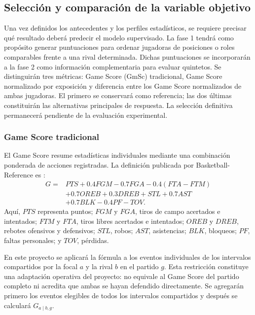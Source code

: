 \subsection{Selección y comparación de la variable objetivo}
\label{subsec:variable-objetivo-fase1}
Una vez definidos los antecedentes y los perfiles estadísticos, se requiere precisar qué resultado deberá predecir el modelo supervisado. La fase 1 tendrá como propósito generar puntuaciones para ordenar jugadoras de posiciones o roles comparables frente a una rival determinada. Dichas puntuaciones se incorporarán a la fase 2 como información complementaria para evaluar quintetos. Se distinguirán tres métricas: Game Score (GmSc) tradicional, Game Score normalizado por exposición y diferencia entre los Game Score normalizados de ambas jugadoras. El primero se conservará como referencia; las dos últimas constituirán las alternativas principales de respuesta. La selección definitiva permanecerá pendiente de la evaluación experimental.

\subsubsection*{Game Score tradicional}
El Game Score resume estadísticas individuales mediante una combinación ponderada de acciones registradas. La definición publicada por Basketball-Reference es \cite{basketballReferenceGameScore}:
\begin{equation}
\begin{split}
G={}&PTS+0.4FGM-0.7FGA-0.4(FTA-FTM)\\
&+0.7OREB+0.3DREB+STL+0.7AST\\
&+0.7BLK-0.4PF-TOV.
\end{split}
\label{eq:gmsc-615}
\end{equation}
Aquí, $PTS$ representa puntos; $FGM$ y $FGA$, tiros de campo acertados e intentados; $FTM$ y $FTA$, tiros libres acertados e intentados; $OREB$ y $DREB$, rebotes ofensivos y defensivos; $STL$, robos; $AST$, asistencias; $BLK$, bloqueos; $PF$, faltas personales; y $TOV$, pérdidas.

En este proyecto se aplicará la fórmula a los eventos individuales de los intervalos compartidos por la focal $a$ y la rival $b$ en el partido $g$. Esta restricción constituye una adaptación operativa del proyecto: no equivale al Game Score del partido completo ni acredita que ambas se hayan defendido directamente. Se agregarán primero los eventos elegibles de todos los intervalos compartidos y después se calculará $G_{a\mid b,g}$.

